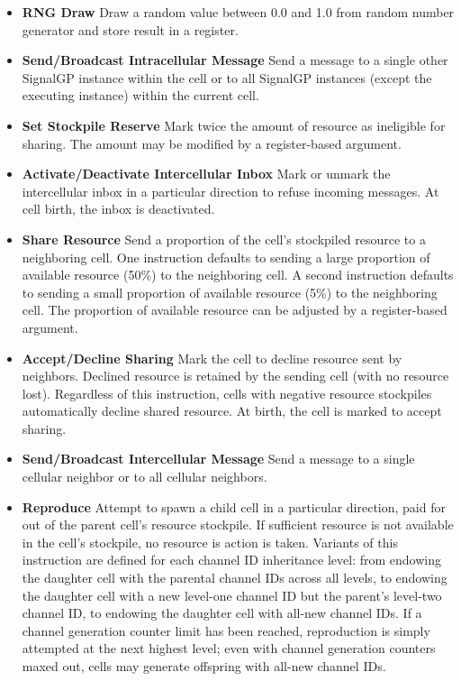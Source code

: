 \begin{itemize}
\item \textbf{RNG Draw}
Draw a random value between 0.0 and 1.0 from random number generator and store result in a register.
\item \textbf{Send/Broadcast Intracellular Message}
Send a message to a single other SignalGP instance within the cell or to all SignalGP instances (except the executing instance) within the current cell.
\item \textbf{Set Stockpile Reserve}
Mark twice the amount of resource as ineligible for sharing.
The amount may be modified by a register-based argument.
\item \textbf{Activate/Deactivate Intercellular Inbox}
Mark or unmark the intercellular inbox in a particular direction to refuse incoming messages.
At cell birth, the inbox is deactivated.
\item \textbf{Share Resource}
Send a proportion of the cell's stockpiled resource to a neighboring cell.
One instruction defaults to sending a large proportion of available resource (50\%) to the neighboring cell.
A second instruction defaults to sending a small proportion of available resource (5\%) to the neighboring cell.
The proportion of available resource can be adjusted by a register-based argument.
\item \textbf{Accept/Decline Sharing}
Mark the cell to decline resource sent by neighbors.
Declined resource is retained by the sending cell (with no resource lost).
Regardless of this instruction, cells with negative resource stockpiles automatically decline shared resource.
At birth, the cell is marked to accept sharing.
\item \textbf{Send/Broadcast Intercellular Message}
Send a message to a single cellular neighbor or to all cellular neighbors.
\item \textbf{Reproduce}
Attempt to spawn a child cell in a particular direction, paid for out of the parent cell's resource stockpile.
If sufficient resource is not available in the cell's stockpile, no resource is action is taken.
Variants of this instruction are defined for each channel ID inheritance level: from endowing the daughter cell with the parental channel IDs across all levels, to endowing the daughter cell with a new level-one channel ID but the parent's level-two channel ID, to endowing the daughter cell with all-new channel IDs.
If a channel generation counter limit has been reached, reproduction is simply attempted at the next highest level; even with channel generation counters maxed out, cells may generate offspring with all-new channel IDs.

\end{itemize}
